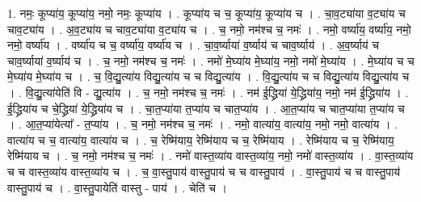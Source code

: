 \documentclass[17pt]{extarticle}
\begin{document}
1. नमः॒ कूप्या॑य॒ कूप्या॑य॒ नमो॒ नमः॒ कूप्या॑य । . कूप्या॑य च च॒ कूप्या॑य॒ कूप्या॑य च । . चा॒व॒ट्या॑या व॒ट्या॑य च चाव॒ट्या॑य । . अ॒व॒ट्या॑य च चाव॒ट्या॑या व॒ट्या॑य च । . च॒ नमो॒ नम॑श्च च॒ नमः॑ । . नमो॒ वर्ष्या॑य॒ वर्ष्या॑य॒ नमो॒ नमो॒ वर्ष्या॑य । . वर्ष्या॑य च च॒ वर्ष्या॑य॒ वर्ष्या॑य च । . चा॒व॒र्ष्याया॑ व॒र्ष्याय॑ च चाव॒र्ष्याय॑ । . अ॒व॒र्ष्याय॑ च चाव॒र्ष्याया॑ व॒र्ष्याय॑ च । . च॒ नमो॒ नम॑श्च च॒ नमः॑ । . नमो॑ मे॒घ्या॑य मे॒घ्या॑य॒ नमो॒ नमो॑ मे॒घ्या॑य । . मे॒घ्या॑य च च मे॒घ्या॑य मे॒घ्या॑य च । . च॒ वि॒द्यु॒त्या॑य विद्यु॒त्या॑य च च विद्यु॒त्या॑य । . वि॒द्यु॒त्या॑य च च विद्यु॒त्या॑य विद्यु॒त्या॑य च । . वि॒द्यु॒त्या॑येति॑ वि - द्यु॒त्या॑य । . च॒ नमो॒ नम॑श्च च॒ नमः॑ । . नम॑ ई॒द्ध्रिया॑ ये॒द्ध्रिया॑य॒ नमो॒ नम॑ ई॒द्ध्रिया॑य । . ई॒द्ध्रिया॑य च चे॒द्ध्रिया॑ ये॒द्ध्रिया॑य च । . चा॒त॒प्या॑या त॒प्या॑य च चात॒प्या॑य । . आ॒त॒प्या॑य च चात॒प्या॑या त॒प्या॑य च । . आ॒त॒प्या॑येत्या᳚ - त॒प्या॑य । . च॒ नमो॒ नम॑श्च च॒ नमः॑ । . नमो॒ वात्या॑य॒ वात्या॑य॒ नमो॒ नमो॒ वात्या॑य । . वात्या॑य च च॒ वात्या॑य॒ वात्या॑य च । . च॒ रेष्मि॑याय॒ रेष्मि॑याय च च॒ रेष्मि॑याय । . रेष्मि॑याय च च॒ रेष्मि॑याय॒ रेष्मि॑याय च । . च॒ नमो॒ नम॑श्च च॒ नमः॑ । . नमो॑ वास्त॒व्या॑य वास्त॒व्या॑य॒ नमो॒ नमो॑ वास्त॒व्या॑य । . वा॒स्त॒व्या॑य च च वास्त॒व्या॑य वास्त॒व्या॑य च । . च॒ वा॒स्तु॒पाय॑ वास्तु॒पाय॑ च च वास्तु॒पाय॑ । . वा॒स्तु॒पाय॑ च च वास्तु॒पाय॑ वास्तु॒पाय॑ च । . वा॒स्तु॒पायेति॑ वास्तु - पाय॑ । . चेति॑ च । \newline
\end{document}
